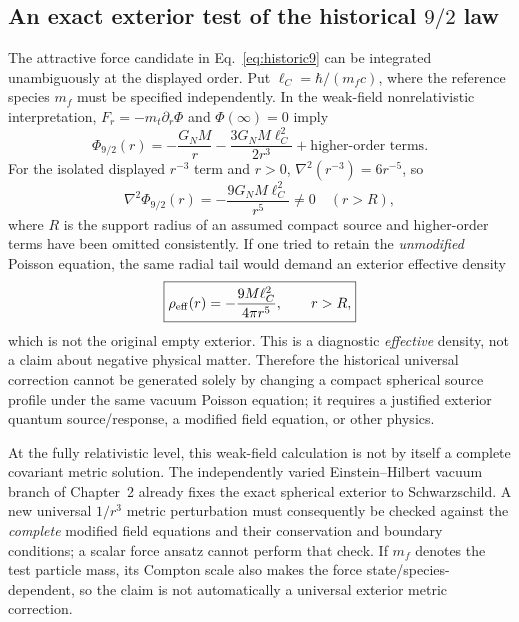 \documentclass[11pt,a4paper]{article}
\begin{document}
\subsection{An exact exterior test of the historical $9/2$ law}
\label{sec:poisson-residual}
The attractive force candidate in Eq.~\eqref{eq:historic9} can be
integrated unambiguously at the displayed order. Put
$\ell_C=\hbar/(m_fc)$, where the reference species $m_f$ must be
specified independently. In the weak-field nonrelativistic
interpretation, $F_r=-m_t\partial_r\Phi$ and $\Phi(\infty)=0$ imply
\begin{equation}\label{eq:quantum-candidate-potential}
\boxed{\displaystyle
\Phi_{9/2}(r)=-\frac{G_NM}{r}
-\frac{3G_NM\ell_C^2}{2r^3}
+\text{higher-order terms}.}
\end{equation}
For the isolated displayed $r^{-3}$ term and $r>0$,
$\nabla^2(r^{-3})=6r^{-5}$, so
\begin{equation}\label{eq:quantum-laplacian-test}
\boxed{\displaystyle
\nabla^2\Phi_{9/2}(r)=-\frac{9G_NM\ell_C^2}{r^5}\ne0
\quad (r>R),}
\end{equation}
where $R$ is the support radius of an assumed compact source and
higher-order terms have been omitted consistently. If one tried to
retain the \emph{unmodified} Poisson equation, the same radial tail
would demand an exterior effective density
\begin{equation}\label{eq:quantum-rho-eff}
\boxed{\displaystyle
\rho_{\rm eff}(r)=-\frac{9M\ell_C^2}{4\pi r^5},
\qquad r>R,}
\end{equation}
which is not the original empty exterior. This is a diagnostic
\emph{effective} density, not a claim about negative physical matter.
Therefore the historical universal correction cannot be generated
solely by changing a compact spherical source profile under the same
vacuum Poisson equation; it requires a justified exterior quantum
source/response, a modified field equation, or other physics.

At the fully relativistic level, this weak-field calculation is not
by itself a complete covariant metric solution. The independently
varied Einstein--Hilbert vacuum branch of Chapter~2 already fixes
the exact spherical exterior to Schwarzschild. A new universal
$1/r^3$ metric perturbation must consequently be checked against the
\emph{complete} modified field equations and their conservation and
boundary conditions; a scalar force ansatz cannot perform that check.
If $m_f$ denotes the test particle mass, its Compton scale also makes
the force state/species-dependent, so the claim is not automatically a
universal exterior metric correction.
\end{document}
